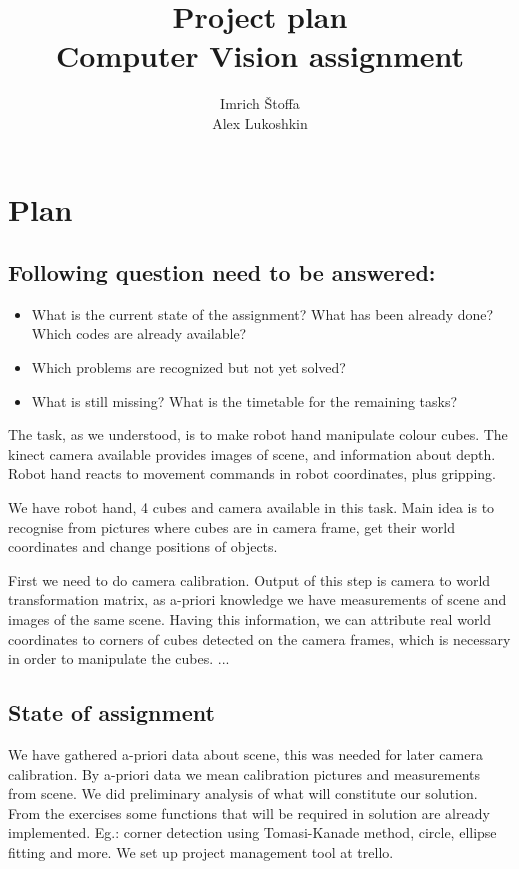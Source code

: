 \documentclass[a4]{report}
\title{Project plan\\Computer Vision assignment}
\author{Imrich Štoffa\\Alex Lukoshkin}
\begin{document}
\maketitle

\chapter*{Plan}

\section*{Following question need to be answered:}
\begin{itemize}
    \item What is the current state of the assignment? What has been already done? Which codes are already available?
    \item Which problems are recognized but not yet solved?
    \item What is still missing? What is the timetable for the remaining tasks?
\end{itemize}

The task, as we understood, is to make robot hand manipulate colour cubes. The kinect camera available provides images of scene, and information about depth. Robot hand reacts to movement commands in robot coordinates, plus gripping. 

We have robot hand, 4 cubes and camera available in this task. Main idea is to recognise from pictures where cubes are in camera frame, get their world coordinates and change positions of objects.

First we need to do camera calibration. Output of this step is camera to world transformation matrix, as a-priori knowledge we have measurements of scene and images of the same scene. Having this information, we can attribute real world coordinates to corners of cubes detected on the camera frames, which is necessary in order to manipulate the cubes. ...

\setcounter{chapter}{1}
\setcounter{section}{-1}

\section{State of assignment}

We have gathered a-priori data about scene, this was needed for later camera calibration. By a-priori data we mean calibration pictures and measurements from scene. We did preliminary analysis of what will constitute our solution. From the exercises some functions that will be required in solution are already implemented. Eg.: corner detection using Tomasi-Kanade method, circle, ellipse fitting and more. We set up project management tool at trello. 
\end{document}
